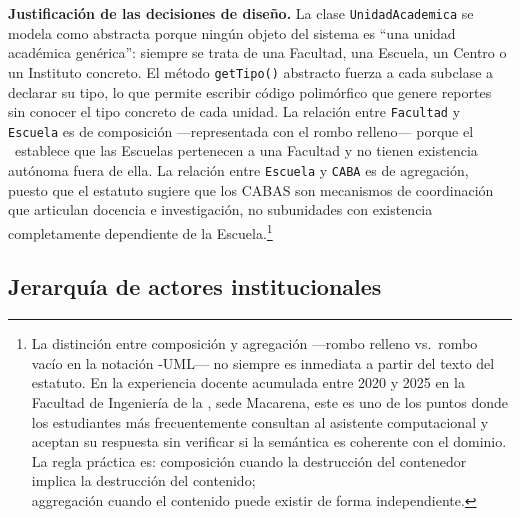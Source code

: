 \textbf{Justificación de las decisiones de diseño.} La clase
\texttt{UnidadAcademica} se modela como abstracta porque ningún objeto del
sistema es ``una unidad académica genérica'': siempre se trata de una Facultad,
una Escuela, un Centro o un Instituto concreto. El método \texttt{getTipo()}
abstracto fuerza a cada subclase a declarar su tipo, lo que permite escribir
código polimórfico que genere reportes sin conocer el tipo concreto de cada
unidad. La relación entre \texttt{Facultad} y \texttt{Escuela} es de
composición ---representada con el rombo relleno--- porque el \acuerdo\
establece que las Escuelas pertenecen a una Facultad y no tienen existencia
autónoma fuera de ella. La relación entre \texttt{Escuela} y \texttt{CABA}
es de agregación, puesto que el estatuto sugiere que los CABAS son mecanismos
de coordinación que articulan docencia e investigación, no subunidades
con existencia completamente dependiente de la Escuela.\footnote{%
  La distinción entre composición y agregación ---rombo relleno vs.\ rombo
  vacío en la notación -UML--- no siempre es inmediata a partir del texto
  del estatuto. En la experiencia docente acumulada entre 2020 y 2025 en
  la Facultad de Ingeniería de la \ud, sede Macarena, este es uno de los
  puntos donde los estudiantes más frecuentemente consultan al asistente
  computacional y aceptan su respuesta sin verificar si la semántica es
  coherente con el dominio. La regla práctica es: composición cuando la
  destrucción del contenedor implica la destrucción del contenido;\\aggregación
  cuando el contenido puede existir de forma independiente.}

\subsection{Jerarquía de actores institucionales}
\label{subsec:jerarquia-actores}

